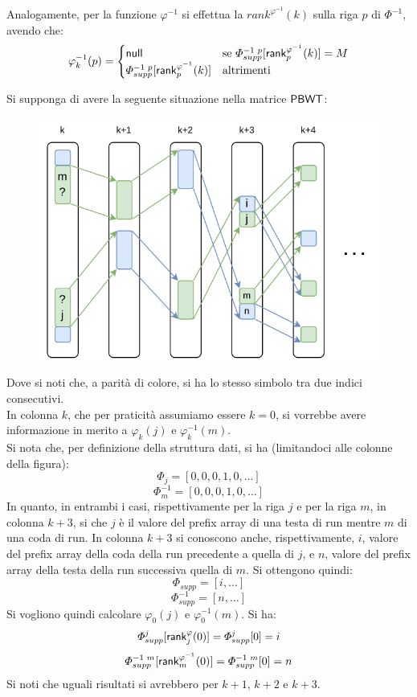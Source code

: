 Analogamente, per la funzione $\varphi^{-1}$ si effettua la
$rank^{\varphi^{-1}}(k)$ 
sulla riga $p$ di $\varPhi^{-1}$, avendo che:
\[\varphi_k^{-1}(p)=
  \begin{cases}
    \mbox{\rm {\sf null}}&\mbox{se }\varPhi^{-1\,\,p}_{supp}[\mbox{\rm {\sf rank}}^{\varphi^{-1}}_p(k)]=M\\
    \varPhi^{-1\,\,p}_{supp}[\mbox{\rm {\sf rank}}^{\varphi^{-1}}_p(k)]&\mbox{altrimenti }
  \end{cases}
\]
\begin{esempio}
  Si supponga di avere la seguente situazione nella matrice $\mbox{\rm {\sf PBWT}}$:
  \begin{figure}[H]
    \centering
    \includegraphics[scale = 0.8]{img/phi.pdf}   
  \end{figure}
  Dove si noti che, a parità di colore, si ha lo stesso simbolo tra due indici
  consecutivi. \\
  In colonna $k$, che per praticità assumiamo essere $k=0$, si vorrebbe avere
  informazione in merito a $\varphi_k(j)$ e $\varphi^{-1}_k(m)$. \\
  Si nota che, per definizione della struttura dati, si ha (limitandoci alle
  colonne della figura):
  \[\varPhi_j=[0,0,0,1,0, \ldots]\]
  \[\varPhi^{-1}_m=[0,0,0,1,0,\ldots]\]
  In quanto, in entrambi i casi, rispettivamente per la riga $j$ e per la riga
  $m$, 
  in colonna $k+3$, si che $j$ è il valore del prefix array di una testa di run
  mentre $m$ di una coda di run. In colonna $k+3$ si conoscono anche,
  rispettivamente, $i$, valore del prefix array della coda della run precedente
  a quella di $j$, e $n$, valore del prefix array della testa della run
  successiva quella di $m$. Si ottengono quindi:
  \[\varPhi_{supp}=[i,\ldots]\]
  \[\varPhi^{-1}_{supp}=[n,\ldots]\]
  Si vogliono quindi calcolare $\varphi_0(j)$ e  $\varphi^{-1}_0(m)$. Si ha:
  \[\varPhi_{supp}^j[\mbox{\rm {\sf rank}}^\varphi_j(0)]=\varPhi_{supp}^j[0]=i\]
  \[\varPhi^{-1\,\,m}_{supp}[\mbox{\rm {\sf rank}}^{\varphi^{-1}}_m(0)]=\varPhi^{-1\,\,m}_{supp}[0]=n\]
  Si noti che uguali risultati si avrebbero per $k+1$, $k+2$ e $k+3$.
\end{esempio}
